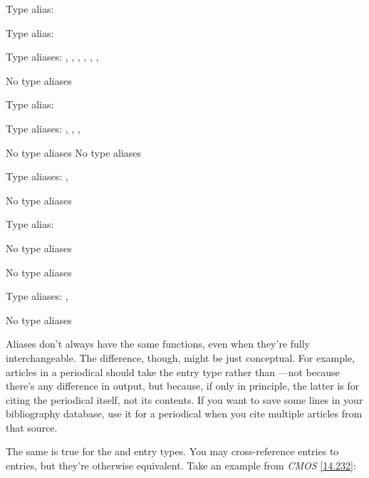 \documentclass[11pt,letterpaper,oneside]{article}
\begin{document}
\begin{typelist}
\RaggedRight


Type alias: 


Type alias: 


Type aliases: , , ,
, , ,

 No type aliases


Type alias: 


Type aliases: , ,
, 

 No type aliases
 No type aliases

Type aliases: , 

 No type aliases


Type alias: 

 No type aliases

 No type aliases


Type aliases: , 

 No type aliases

\end{typelist}

Aliases don't always have the same functions, even when they're fully
interchangeable. The difference, though, might be just conceptual. For
example, articles in a periodical should take the 
entry type rather than ---not because there's any
difference in output, but because, if only in principle, the latter is
for citing the periodical itself, not its contents. If you want to
save some lines in your bibliography database, use it for a periodical
when you cite multiple articles from that source.

The same is true for the  and 
entry types. You may cross-reference  entries to
 entries, but they're otherwise equivalent. Take an
example from \textit{CMOS} \ref{14.232}:
\end{document}

